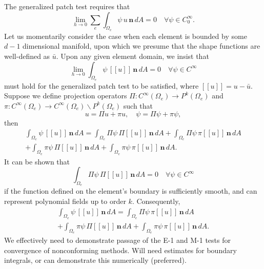 \documentclass[12pt]{article}
\begin{document}
The generalized patch test requires that
\begin{equation}
	\lim_{h \rightarrow 0} \sum_e \int_{\Omega_e} \psi \, u \, \mathbf{n} \, dA = 0 \quad \forall \psi \in C^\infty_0.
\end{equation}
Let us momentarily consider the case when each element is bounded by some $d-1$ dimensional manifold, upon which we presume that the shape functions are well-defined as $\bar{u}$. Upon any given element domain, we insist that
\begin{equation}
	\lim_{h \rightarrow 0} \int_{\Omega_e} \psi \, [\![ u ]\!] \, \mathbf{n} \, dA = 0 \quad \forall \psi \in C^\infty
\end{equation}
must hold for the generalized patch test to be satisfied, where $[\![ u ]\!] = u - \bar{u}$. Suppose we define projection operators $\Pi : C^\infty(\Omega_e) \rightarrow P^k (\Omega_e)$ and $\pi : C^\infty(\Omega_e) \rightarrow C^\infty(\Omega_e) \backslash P^k (\Omega_e)$ such that
\begin{equation}
	u = \Pi u + \pi u, \quad \psi = \Pi \psi + \pi \psi,
\end{equation}
then
\begin{eqnarray}
	\int_{\Omega_e} \psi \, [\![ u ]\!] \, \mathbf{n} \, dA = \int_{\Omega_e} \Pi \psi \, \Pi [\![ u ]\!] \, \mathbf{n} \, dA + \int_{\Omega_e} \Pi \psi \, \pi [\![ u ]\!] \, \mathbf{n} \, dA \\ + \int_{\Omega_e} \pi \psi \, \Pi [\![ u ]\!] \, \mathbf{n} \, dA +
\int_{\Omega_e} \pi \psi \, \pi [\![ u ]\!] \, \mathbf{n} \, dA.
\end{eqnarray}
It can be shown that
\begin{equation}
	\int_{\Omega_e} \Pi \psi \, \Pi [\![ u ]\!] \, \mathbf{n} \, dA = 0 \quad \forall \psi \in C^\infty
\end{equation}
if the function defined on the element's boundary is sufficiently smooth, and can represent polynomial fields up to order $k$. Consequently,
\begin{eqnarray}
	\int_{\Omega_e} \psi \, [\![ u ]\!] \, \mathbf{n} \, dA = \int_{\Omega_e} \Pi \psi \, \pi [\![ u ]\!] \, \mathbf{n} \, dA \\ + \int_{\Omega_e} \pi \psi \, \Pi [\![ u ]\!] \, \mathbf{n} \, dA +
\int_{\Omega_e} \pi \psi \, \pi [\![ u ]\!] \, \mathbf{n} \, dA.
\end{eqnarray}
We effectively need to demonstrate passage of the E-1 and M-1 tests for convergence of nonconforming methods. Will need estimates for boundary integrals, or can demonstrate this numerically (preferred).
\end{document}
